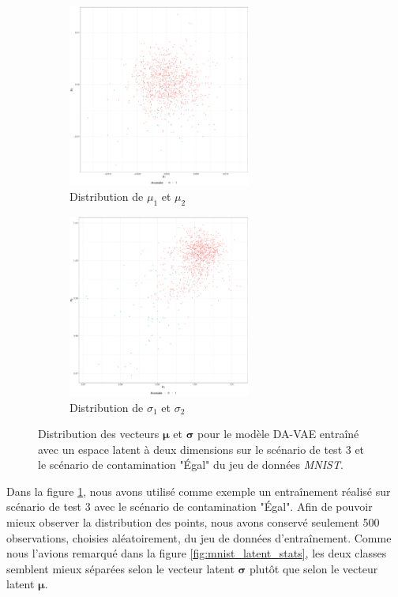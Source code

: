 \begin{figure}[H]
	\centering
	\begin{subfigure}{6cm}
		\centering\includegraphics[width=6cm, height=6cm]{images/latent_stats/mnist_mu_2d}
		\caption{Distribution de $\mu_1$ et $\mu_2$}
	\end{subfigure}
	\begin{subfigure}{6cm}
		\centering\includegraphics[width=6cm, height=6cm]{images/latent_stats/mnist_sigma_2d}
		\caption{Distribution de $\sigma_1$ et $\sigma_2$}
	\end{subfigure}
	\caption{Distribution des vecteurs $\boldsymbol{\mu}$ et $\boldsymbol{\sigma}$ pour le modèle DA-VAE entraîné avec un espace latent à deux dimensions sur le scénario de test 3 et le scénario de contamination "Égal" du jeu de données \textit{MNIST}.}
	\label{fig:mnist_latent_2d}
\end{figure}

Dans la figure \ref{fig:mnist_latent_2d}, nous avons utilisé comme exemple un entraînement réalisé sur scénario de test 3 avec le scénario de contamination "Égal". Afin de pouvoir mieux observer la distribution des points, nous avons conservé seulement 500 observations, choisies aléatoirement, du jeu de données d'entraînement. Comme nous l'avions remarqué dans la figure \ref{fig:mnist_latent_stats}, les deux classes semblent mieux séparées selon le vecteur latent $\boldsymbol{\sigma}$ plutôt que selon le vecteur latent $\boldsymbol{\mu}$.

